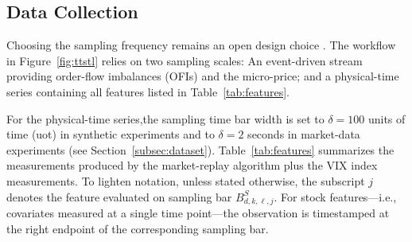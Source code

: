 \documentclass[10pt,a4paper,oneside]{article}
\begin{document}
\subsection{Data Collection}
\label{subsec:data_collection}

Choosing the sampling frequency remains an open design choice \cite{dutta2023review}. The workflow in Figure~\ref{fig:ttstl} relies on two sampling scales: An event-driven stream providing order-flow imbalances (OFIs) and the micro-price; and a physical-time series containing all features listed in Table~\ref{tab:features}.

For the physical-time series,the sampling time bar width is set to $\delta=100$ units of time (uot) in synthetic experiments and to $\delta=2$ seconds in market-data experiments (see Section~\ref{subsec:dataset}). Table~\ref{tab:features} summarizes the measurements produced by the market-replay algorithm plus the VIX index measurements. To lighten notation, unless stated otherwise, the subscript $j$ denotes the feature evaluated on sampling bar $B^{S}_{d,k,\ell,j}$. For stock features—i.e., covariates measured at a single time point—the observation is timestamped at the right endpoint of the corresponding sampling bar.





\end{document}
